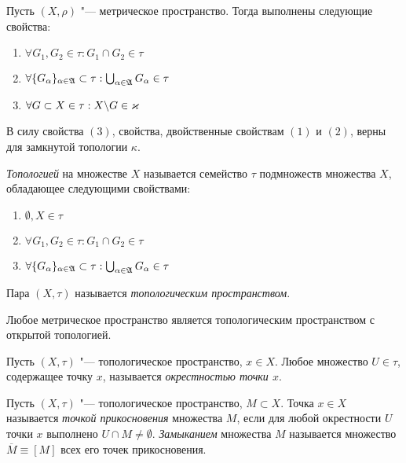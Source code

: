 \begin{note}
	Пусть $(X, \rho)$ "--- метрическое пространство. Тогда выполнены следующие свойства:
	\begin{enumerate}
		\item $\forall G_1, G_2 \in \tau: G_1 \cap G_2 \in \tau$
		\item $\forall \{G_\alpha\}_{\alpha \in \mathfrak A} \subset \tau: \bigcup_{\alpha \in \mathfrak A}G_\alpha \in \tau$
		\item $\forall G \subset X \in \tau: X \backslash G \in \varkappa$
	\end{enumerate}
	
	В силу свойства $(3)$, свойства, двойственные свойствам $(1)$ и $(2)$, верны для замкнутой топологии $\kappa$.
\end{note}

\begin{definition}
	\textit{Топологией} на множестве $X$ называется семейство $\tau$ подмножеств множества $X$, обладающее следующими свойствами:
	\begin{enumerate}
		\item $\emptyset, X \in \tau$
		\item $\forall G_1, G_2 \in \tau: G_1 \cap G_2 \in \tau$
		\item $\forall \{G_\alpha\}_{\alpha \in \mathfrak A} \subset \tau: \bigcup_{\alpha \in \mathfrak A}G_\alpha\in \tau$
	\end{enumerate}
	
	Пара $(X, \tau)$ называется \textit{топологическим пространством}.
\end{definition}

\begin{note}
	Любое метрическое пространство является топологическим пространством с открытой топологией.
\end{note}

\begin{definition}
	Пусть $(X, \tau)$ "--- топологическое пространство, $x \in X$. Любое множество $U \in \tau$, содержащее точку $x$, называется \textit{окрестностью точки $x$}.
\end{definition}

\begin{definition}
	Пусть $(X, \tau)$ "--- топологическое пространство, $M \subset X$. Точка $x \in X$ называется \textit{точкой прикосновения} множества $M$, если для любой окрестности $U$ точки $x$ выполнено $U \cap M \ne \emptyset$. \textit{Замыканием} множества $M$ называется множество $\overline M \equiv [M]$ всех его точек прикосновения.
\end{definition}

